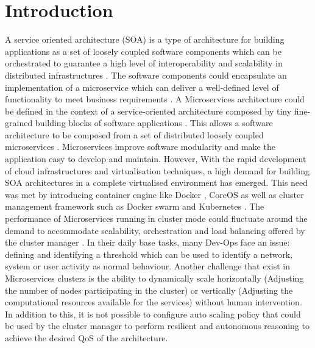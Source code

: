 \documentclass[sigconf]{acmart}
\begin{document}
 \section{Introduction}
A service oriented architecture (SOA) is a type of architecture for building applications as a set of loosely coupled software components which can be orchestrated to guarantee a high level of interoperability and scalability in distributed infrastructures 
\cite{erl2005service}. The software components could encapsulate an implementation of a microservice which can deliver a well-defined level of functionality to meet business requirements \cite{Hurwitz:2009uz}. A Microservices architecture could be defined in the context of a service-oriented architecture composed by tiny fine-grained building blocks of software applications \cite{stubbs2015distributed}. This allows a software architecture to be composed from a set of distributed loosely coupled microservices \cite{stubbs2015distributed}. Microservices improve software modularity and make the application easy to develop and maintain. However, With the rapid development of cloud infrastructures and virtualisation techniques, a high demand for building SOA architectures in a complete virtualised environment has emerged. This need was met by introducing container engine like Docker \cite{merkel2014docker},  CoreOS \cite{rkt:7L_v4nti} as well as cluster management framework such as Docker swarm \cite{Anonymous:2017uo} and Kubernetes \cite{Kubernetes:fnNARIkw}.  
The performance of Microservices running in cluster mode could fluctuate around the demand to accommodate scalability, orchestration and load balancing offered by the cluster manager \cite{stubbs2015distributed}. In their daily base tasks,  many Dev-Ops face an issue: defining and identifying a threshold which can be used to identify a network, system or user activity as normal behaviour. Another challenge that exist in Microservices clusters is the ability to dynamically scale horizontally (Adjusting the number of nodes participating in the cluster) or vertically (Adjusting the computational resources available for the services) without human intervention. In addition to this, it is not possible to configure auto scaling policy that could be used by the cluster manager to perform resilient and autonomous reasoning to achieve the desired QoS of the architecture. 
\end{document}
